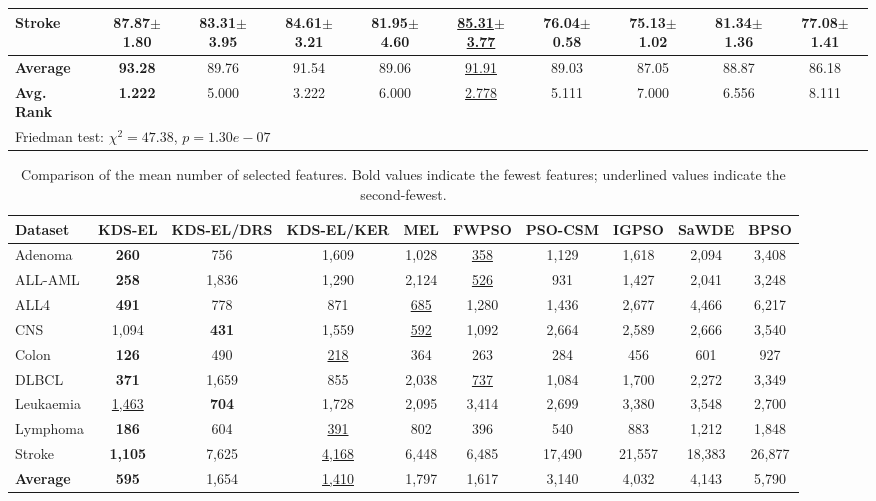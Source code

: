 \begin{table}[t]
\begin{tabular}{lccccccccc}
Stroke & \textbf{87.87$\pm$1.80} & 83.31$\pm$3.95 & 84.61$\pm$3.21 & 81.95$\pm$4.60 & \underline{85.31$\pm$3.77} & 76.04$\pm$0.58 & 75.13$\pm$1.02 & 81.34$\pm$1.36 & 77.08$\pm$1.41 \\
\midrule
\textbf{Average} & \textbf{93.28} & 89.76 & 91.54 & 89.06 & \underline{91.91} & 89.03 & 87.05 & 88.87 & 86.18 \\
\textbf{Avg. Rank} & \textbf{1.222} & 5.000 & 3.222 & 6.000 & \underline{2.778} & 5.111 & 7.000 & 6.556 & 8.111 \\
\midrule
\multicolumn{10}{l}{Friedman test: $\chi^2=47.38$, $p=1.30e-07$} \\
\bottomrule
\end{tabular}
\end{table}

\begin{table}[t]
\centering
\caption{Comparison of the mean number of selected features.
Bold values indicate the fewest features; underlined values indicate the second-fewest.}
\label{tab:features}
\setlength{\tabcolsep}{3.5pt}
\begin{tabular}{lccccccccc}
\toprule
\textbf{Dataset} & \textbf{KDS-EL} & \textbf{KDS-EL/DRS} & \textbf{KDS-EL/KER} & \textbf{MEL} & \textbf{FWPSO} & \textbf{PSO-CSM} & \textbf{IGPSO} & \textbf{SaWDE} & \textbf{BPSO} \\
\midrule
Adenoma & \textbf{260} & 756 & 1,609 & 1,028 & \underline{358} & 1,129 & 1,618 & 2,094 & 3,408 \\
ALL-AML & \textbf{258} & 1,836 & 1,290 & 2,124 & \underline{526} & 931 & 1,427 & 2,041 & 3,248 \\
ALL4 & \textbf{491} & 778 & 871 & \underline{685} & 1,280 & 1,436 & 2,677 & 4,466 & 6,217 \\
CNS & 1,094 & \textbf{431} & 1,559 & \underline{592} & 1,092 & 2,664 & 2,589 & 2,666 & 3,540 \\
Colon & \textbf{126} & 490 & \underline{218} & 364 & 263 & 284 & 456 & 601 & 927 \\
DLBCL & \textbf{371} & 1,659 & 855 & 2,038 & \underline{737} & 1,084 & 1,700 & 2,272 & 3,349 \\
Leukaemia & \underline{1,463} & \textbf{704} & 1,728 & 2,095 & 3,414 & 2,699 & 3,380 & 3,548 & 2,700 \\
Lymphoma & \textbf{186} & 604 & \underline{391} & 802 & 396 & 540 & 883 & 1,212 & 1,848 \\
Stroke & \textbf{1,105} & 7,625 & \underline{4,168} & 6,448 & 6,485 & 17,490 & 21,557 & 18,383 & 26,877 \\
\midrule
\textbf{Average} & \textbf{595} & 1,654 & \underline{1,410} & 1,797 & 1,617 & 3,140 & 4,032 & 4,143 & 5,790 \\
\bottomrule
\end{tabular}
\end{table}

